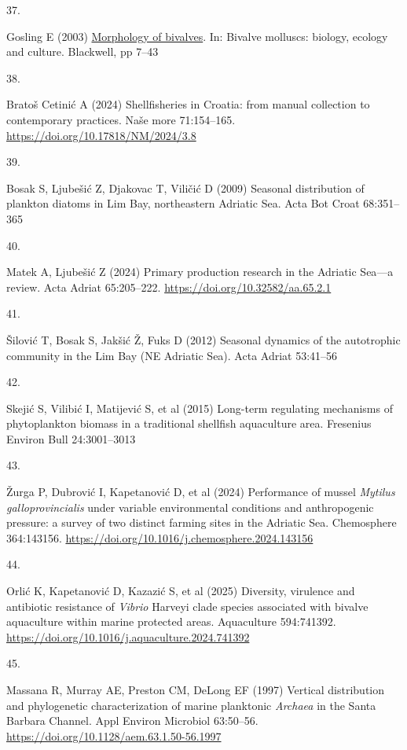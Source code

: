 \documentclass[
  12 pt,
]{article}
\newlength{\cslhangindent}
\newlength{\csllabelwidth}
\newenvironment{CSLReferences}[2] %
 {\begin{list}{}{%
  \setlength{\itemindent}{0pt}
  \setlength{\leftmargin}{0pt}
  \setlength{\parsep}{0pt}
  \ifodd #1
   \setlength{\leftmargin}{\cslhangindent}
   \setlength{\itemindent}{-1\cslhangindent}
  \fi
  \setlength{\itemsep}{#2\baselineskip}}}
 {\end{list}}
\newcommand{\CSLLeftMargin}[1]{\parbox[t]{\csllabelwidth}{\strut#1\strut}}
\newcommand{\CSLRightInline}[1]{\parbox[t]{\linewidth - \csllabelwidth}{\strut#1\strut}}
\begin{document}
\begin{CSLReferences}{0}{0}
\CSLLeftMargin{37. }%
\CSLRightInline{Gosling E (2003) \href{https://doi.org/10.1002/9780470995532.ch2}{Morphology of bivalves}. In: Bivalve molluscs: biology, ecology and culture. Blackwell, pp 7--43}

\CSLLeftMargin{38. }%
\CSLRightInline{Bratoš Cetinić A (2024) Shellfisheries in {Croatia}: from manual collection to contemporary practices. Naše more 71:154--165. \url{https://doi.org/10.17818/NM/2024/3.8}}

\CSLLeftMargin{39. }%
\CSLRightInline{Bosak S, Ljubešić Z, Djakovac T, Viličić D (2009) Seasonal distribution of plankton diatoms in {Lim Bay}, northeastern {Adriatic Sea}. Acta Bot Croat 68:351--365}

\CSLLeftMargin{40. }%
\CSLRightInline{Matek A, Ljubešić Z (2024) Primary production research in the {Adriatic Sea}---a review. Acta Adriat 65:205--222. \url{https://doi.org/10.32582/aa.65.2.1}}

\CSLLeftMargin{41. }%
\CSLRightInline{Šilović T, Bosak S, Jakšić Ž, Fuks D (2012) Seasonal dynamics of the autotrophic community in the {Lim Bay} ({NE Adriatic Sea}). Acta Adriat 53:41--56}

\CSLLeftMargin{42. }%
\CSLRightInline{Skejić S, Vilibić I, Matijević S, et al (2015) Long-term regulating mechanisms of phytoplankton biomass in a traditional shellfish aquaculture area. Fresenius Environ Bull 24:3001--3013}

\CSLLeftMargin{43. }%
\CSLRightInline{Žurga P, Dubrović I, Kapetanović D, et al (2024) Performance of mussel {{\emph{Mytilus}}}{{\emph{ galloprovincialis}}} under variable environmental conditions and anthropogenic pressure: a survey of two distinct farming sites in the {Adriatic Sea}. Chemosphere 364:143156. \url{https://doi.org/10.1016/j.chemosphere.2024.143156}}

\CSLLeftMargin{44. }%
\CSLRightInline{Orlić K, Kapetanović D, Kazazić S, et al (2025) Diversity, virulence and antibiotic resistance of {{\emph{Vibrio}}} {Harveyi} clade species associated with bivalve aquaculture within marine protected areas. Aquaculture 594:741392. \url{https://doi.org/10.1016/j.aquaculture.2024.741392}}

\CSLLeftMargin{45. }%
\CSLRightInline{Massana R, Murray AE, Preston CM, DeLong EF (1997) Vertical distribution and phylogenetic characterization of marine planktonic {{\emph{Archaea}}} in the {Santa Barbara Channel}. Appl Environ Microbiol 63:50--56. \url{https://doi.org/10.1128/aem.63.1.50-56.1997}}


\end{CSLReferences}
\end{document}

